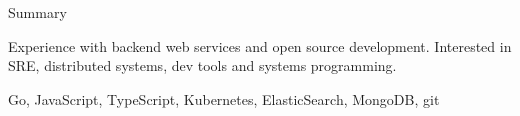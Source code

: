 \documentclass{resume} %
\begin{document}

\begin{rSection}{Summary}
  \begin{rSummarySection}
  {
    \item Experience with backend web services and open source development. Interested in SRE, distributed systems, dev tools and systems programming.
    \item Go, JavaScript, TypeScript, Kubernetes, ElasticSearch, MongoDB, git
  }
  \end{rSummarySection}
\end{rSection}

\end{document}
